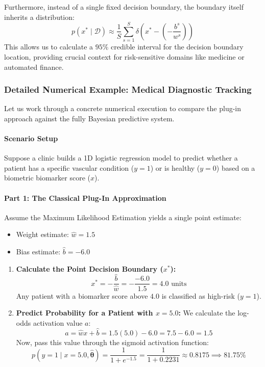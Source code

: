 \documentclass{article}
\begin{document}
Furthermore, instead of a single fixed decision boundary, the boundary itself inherits a distribution:
\begin{equation}
p(x^* \mid \mathcal{D}) \approx \frac{1}{S} \sum_{s=1}^S \delta\left(x^* - \left(-\frac{b^s}{w^s}\right)\right)
\end{equation}
This allows us to calculate a $95\%$ credible interval for the decision boundary location, providing crucial context for risk-sensitive domains like medicine or automated finance.

\subsubsection{Detailed Numerical Example: Medical Diagnostic Tracking}

Let us work through a concrete numerical execution to compare the plug-in approach against the fully Bayesian predictive system.

\paragraph{Scenario Setup}
Suppose a clinic builds a 1D logistic regression model to predict whether a patient has a specific vascular condition ($y=1$) or is healthy ($y=0$) based on a biometric biomarker score ($x$).

\paragraph{Part 1: The Classical Plug-In Approximation}
Assume the Maximum Likelihood Estimation yields a single point estimate:
\begin{itemize}
    \item Weight estimate: $\hat{w} = 1.5$
    \item Bias estimate: $\hat{b} = -6.0$
\end{itemize}

\begin{enumerate}
    \item \textbf{Calculate the Point Decision Boundary ($x^*$):}
    \begin{equation}
    x^* = -\frac{\hat{b}}{\hat{w}} = -\frac{-6.0}{1.5} = 4.0\text{ units}
    \end{equation}
    Any patient with a biomarker score above $4.0$ is classified as high-risk ($y=1$).
    
    \item \textbf{Predict Probability for a Patient with $x = 5.0$:}
    We calculate the log-odds activation value $a$:
    \begin{equation}
    a = \hat{w}x + \hat{b} = 1.5(5.0) - 6.0 = 7.5 - 6.0 = 1.5
    \end{equation}
    Now, pass this value through the sigmoid activation function:
    \begin{equation}
    p(y = 1 \mid x=5.0, \hat{\boldsymbol{\theta}}) = \frac{1}{1 + e^{-1.5}} = \frac{1}{1 + 0.2231} \approx 0.8175 \implies 81.75\%
    \end{equation}
\end{enumerate}
\end{document}
